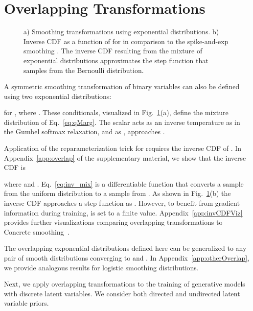 \documentclass{article}
\begin{document}
\section{Overlapping Transformations} \label{sec:transform}
\begin{figure}
  \centering
    \caption{a) Smoothing transformations using exponential distributions. b) Inverse CDF as a function of  for  in comparison to the spike-and-exp smoothing \cite{rolfe2016discrete}. The inverse CDF resulting from the mixture of exponential distributions approximates the
    step function that samples from the Bernoulli distribution.
    }
     \label{fig:exp_smooth}
\end{figure}

A symmetric smoothing transformation of binary variables can also be defined using two exponential distributions:

for , where . These conditionals, visualized in Fig.~\ref{fig:exp_smooth}(a),
define the mixture distribution  of Eq.~\eqref{eq:qMarg}.
The scalar  acts as an inverse temperature as in the Gumbel softmax relaxation, and as ,  approaches .

Application of the reparameterization trick for  requires the inverse CDF of . In Appendix~\ref{app:overlap} of the supplementary material, we show that the inverse CDF is

where  and . 
Eq.~\eqref{eq:inv_mix} is a differentiable function that
converts a sample  from the uniform distribution  to a sample
from . As shown in Fig.~\ref{fig:exp_smooth}(b) the inverse CDF approaches a step function as . However, to benefit from gradient information during training,  is set to a finite value. Appendix~\ref{app:invCDFViz} provides further visualizations comparing overlapping transformations to Concrete smoothing~\cite{maddison2016concrete, jang2016categorical}.

The overlapping exponential distributions defined here can be generalized to any pair of smooth 
distributions converging to  and . In Appendix~\ref{app:otherOverlap}, we provide analogous results for logistic smoothing distributions.

Next, we apply overlapping transformations to the training of generative models with discrete latent variables. We consider both directed and 
undirected latent variable priors.
\end{document}
